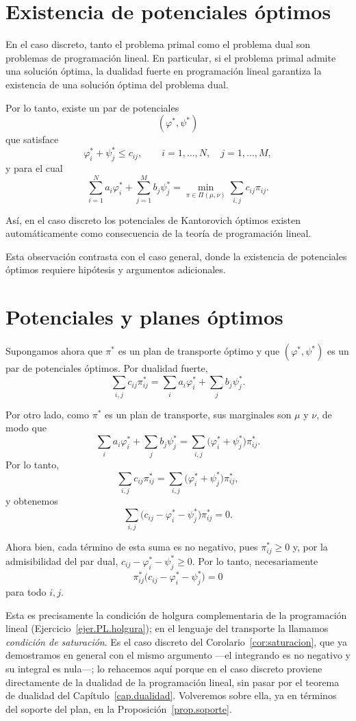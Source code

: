 \documentclass[12pt, a4paper]{amsbook}
\theoremstyle{remark}
\theoremstyle{definition}
\numberwithin{section}{chapter}
\numberwithin{subsection}{section}
\numberwithin{equation}{section}
\numberwithin{figure}{chapter}
\begin{document}
\section{Existencia de potenciales óptimos}

En el caso discreto, tanto el problema primal como el problema dual son
problemas de programación lineal. En particular, si el problema primal
admite una solución óptima, la dualidad fuerte en programación lineal
garantiza la existencia de una solución óptima del problema dual.

Por lo tanto, existe un par de potenciales
\[
(\varphi^*,\psi^*)
\]
que satisface
\[
\varphi_i^*+\psi_j^*\leq c_{ij},
\qquad
i=1,\ldots,N,\quad j=1,\ldots,M,
\]
y para el cual
\[
\sum_{i=1}^N a_i\varphi_i^*
+
\sum_{j=1}^M b_j\psi_j^*
=
\min_{\pi\in\Pi(\mu,\nu)}
\sum_{i,j}c_{ij}\pi_{ij}.
\]

Así, en el caso discreto los potenciales de Kantorovich óptimos existen
automáticamente como consecuencia de la teoría de programación lineal.

Esta observación contrasta con el caso general, donde la existencia de
potenciales óptimos requiere hipótesis y argumentos adicionales.

\section{Potenciales y planes óptimos}

Supongamos ahora que $\pi^*$ es un plan de transporte óptimo y que
$(\varphi^*,\psi^*)$ es un par de potenciales óptimos. Por dualidad fuerte,
\[
\sum_{i,j}c_{ij}\pi_{ij}^*
=
\sum_i a_i\varphi_i^*
+
\sum_j b_j\psi_j^*.
\]

Por otro lado, como $\pi^*$ es un plan de transporte, sus marginales son
$\mu$ y $\nu$, de modo que
\[
\sum_i a_i\varphi_i^*
+
\sum_j b_j\psi_j^*
=
\sum_{i,j}
\bigl(\varphi_i^*+\psi_j^*\bigr)\pi_{ij}^*.
\]
Por lo tanto,
\[
\sum_{i,j}
c_{ij}\pi_{ij}^*
=
\sum_{i,j}
\bigl(\varphi_i^*+\psi_j^*\bigr)\pi_{ij}^*,
\]
y obtenemos
\[
\sum_{i,j}
\bigl(c_{ij}-\varphi_i^*-\psi_j^*\bigr)
\pi_{ij}^*
=0.
\]

Ahora bien, cada término de esta suma es no negativo, pues
\(
\pi_{ij}^*\geq0
\)
y, por la admisibilidad del par dual,
\(
c_{ij}-\varphi_i^*-\psi_j^*\geq0.
\)
Por lo tanto, necesariamente
\[
\pi_{ij}^*
\bigl(c_{ij}-\varphi_i^*-\psi_j^*\bigr)=0
\]
para todo $i,j$.

Esta es precisamente la condición de holgura complementaria de la programación
lineal (Ejercicio~\ref{ejer.PL.holgura}); en el lenguaje del transporte la
llamamos \emph{condición de saturación}. Es el caso discreto del
Corolario~\ref{cor:saturacion}, que ya demostramos en general con el mismo
argumento —el integrando es no negativo y su integral es nula—; lo rehacemos
aquí porque en el caso discreto proviene directamente de la dualidad de la
programación lineal, sin pasar por el teorema de dualidad del
Capítulo~\ref{cap.dualidad}. Volveremos sobre ella, ya en términos del
soporte del plan, en la Proposición~\ref{prop.soporte}.
\end{document}
